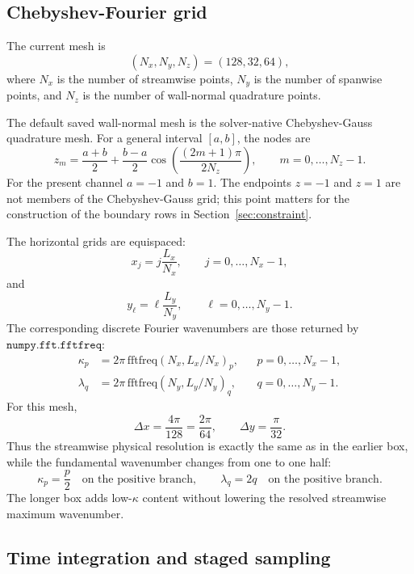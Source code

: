 \documentclass[11pt]{article}
\begin{document}
\subsection{Chebyshev-Fourier grid}

The current mesh is
\[
  (N_x,N_y,N_z) = (128,32,64),
\]
where \(N_x\) is the number of streamwise points, \(N_y\) is the number of
spanwise points, and \(N_z\) is the number of wall-normal quadrature points.

The default saved wall-normal mesh is the solver-native Chebyshev-Gauss
quadrature mesh. For a general interval \([a,b]\), the nodes are
\begin{equation}
  z_m = \frac{a+b}{2} + \frac{b-a}{2}
        \cos\left(\frac{(2m+1)\pi}{2N_z}\right),
  \qquad m=0,\ldots,N_z-1.
  \label{eq:cheb_gauss_nodes}
\end{equation}
For the present channel \(a=-1\) and \(b=1\). The endpoints \(z=-1\) and
\(z=1\) are not members of the Chebyshev-Gauss grid; this point matters for
the construction of the boundary rows in Section~\ref{sec:constraint}.

The horizontal grids are equispaced:
\begin{equation}
  x_j = j\frac{L_x}{N_x},\qquad j=0,\ldots,N_x-1,
  \label{eq:x_grid}
\end{equation}
and
\begin{equation}
  y_\ell = \ell\frac{L_y}{N_y},\qquad \ell=0,\ldots,N_y-1.
  \label{eq:y_grid}
\end{equation}
The corresponding discrete Fourier wavenumbers are those returned by
\(\texttt{numpy.fft.fftfreq}\):
\begin{align}
  \kappa_p &= 2\pi\,\mathrm{fftfreq}(N_x,L_x/N_x)_p,
  &&p=0,\ldots,N_x-1, \label{eq:kappa_grid}\\
  \lambda_q &= 2\pi\,\mathrm{fftfreq}(N_y,L_y/N_y)_q,
  &&q=0,\ldots,N_y-1. \label{eq:lambda_grid}
\end{align}
For this mesh,
\[
  \Delta x=\frac{4\pi}{128}=\frac{2\pi}{64},\qquad
  \Delta y=\frac{\pi}{32}.
\]
Thus the streamwise physical resolution is exactly the same as in the earlier
box, while the fundamental wavenumber changes from one to one half:
\[
  \kappa_p=\frac{p}{2}\quad\text{on the positive branch},\qquad
  \lambda_q=2q\quad\text{on the positive branch}.
\]
The longer box adds low-\(\kappa\) content without lowering the resolved
streamwise maximum wavenumber.

\subsection{Time integration and staged sampling}
\end{document}
